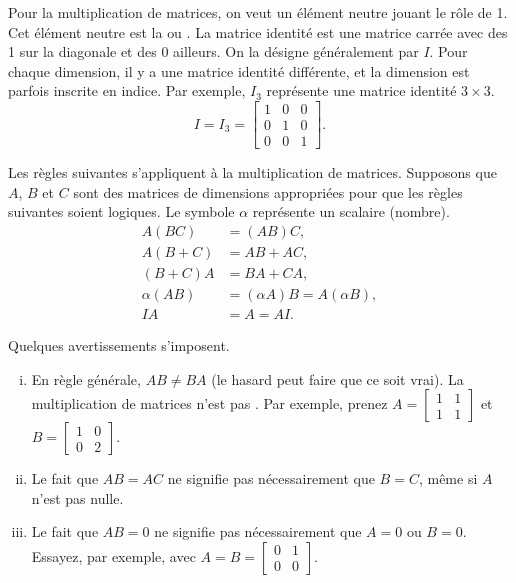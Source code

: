 \medskip

Pour la multiplication de matrices, on veut un élément neutre jouant le rôle de 1.  Cet élément neutre est la \emph{} ou \emph{}.
La matrice identité est une matrice carrée avec des 1 sur la diagonale et des 0 ailleurs. On la désigne généralement par $I$.
Pour chaque dimension, il y a une matrice identité différente, et la dimension est parfois inscrite en indice. Par exemple, $I_3$ représente une matrice identité $3 \times 3$.
\begin{equation*}
I = I_3 =
\begin{bmatrix}
1 & 0 & 0 \\
0 & 1 & 0 \\
0 & 0 & 1
\end{bmatrix} .
\end{equation*}

Les règles suivantes s’appliquent à la multiplication de matrices. Supposons que
$A$, $B$ et $C$ sont des matrices de dimensions appropriées pour que les règles suivantes soient logiques.  Le symbole $\alpha$ représente un scalaire (nombre).
\begin{align*}
A(BC) & = (AB)C, \\
A(B+C) & = AB + AC, \\
(B+C)A & = BA + CA, \\
\alpha(AB) & = (\alpha A)B = A(\alpha B), \\
IA & = A = AI .
\end{align*}

\pagebreak[2]
Quelques avertissements s'imposent.
\begin{enumerate}[(i)]
\item En règle générale, $AB \not= BA$ (le hasard peut faire que ce soit vrai). La multiplication de matrices n’est pas . Par exemple, prenez
$A = \left[ \begin{smallmatrix} 1 & 1 \\ 1 & 1 \end{smallmatrix} \right]$
et
$B = \left[ \begin{smallmatrix} 1 & 0 \\ 0 & 2 \end{smallmatrix} \right]$.
\item Le fait que $AB = AC$ ne signifie pas nécessairement que $B=C$, même si $A$ n'est pas nulle.
\item Le fait que $AB = 0$ ne signifie pas nécessairement que $A=0$ ou $B=0$.
Essayez, par exemple, avec
$A = B = \left[ \begin{smallmatrix} 0 & 1 \\ 0 & 0 \end{smallmatrix}
\right]$.
\end{enumerate}

